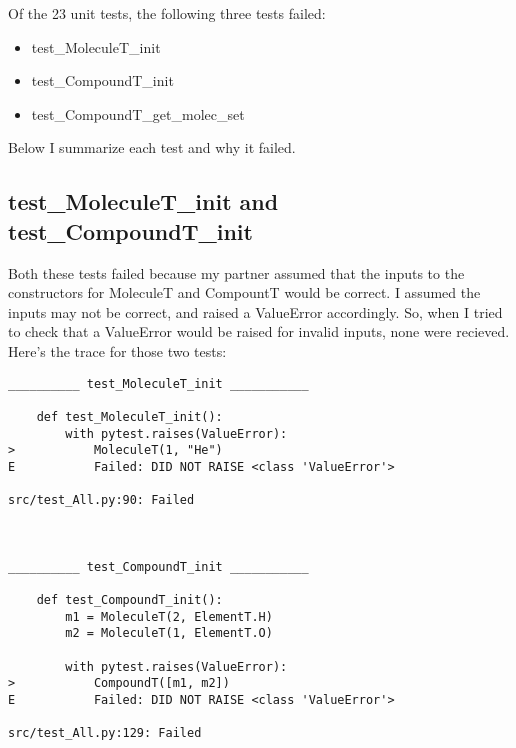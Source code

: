 \documentclass[12pt]{article}
\begin{document}
Of the 23 unit tests, the following three tests failed:
\begin{itemize}
    \item test\_MoleculeT\_init
    \item test\_CompoundT\_init
    \item test\_CompoundT\_get\_molec\_set
\end{itemize}
Below I summarize each test and why it failed.

\clearpage
\subsection{test\_MoleculeT\_init and test\_CompoundT\_init}
Both these tests failed because my partner assumed that the inputs to the constructors for MoleculeT and CompountT would be correct. I assumed the inputs may not be correct, and raised a ValueError accordingly. So, when I tried to check that a ValueError would be raised for invalid inputs, none were recieved. Here's the trace for those two tests:
\begin{lstlisting}
__________ test_MoleculeT_init ___________

    def test_MoleculeT_init():
        with pytest.raises(ValueError):
>           MoleculeT(1, "He")
E           Failed: DID NOT RAISE <class 'ValueError'>

src/test_All.py:90: Failed



__________ test_CompoundT_init ___________

    def test_CompoundT_init():
        m1 = MoleculeT(2, ElementT.H)
        m2 = MoleculeT(1, ElementT.O)

        with pytest.raises(ValueError):
>           CompoundT([m1, m2])
E           Failed: DID NOT RAISE <class 'ValueError'>

src/test_All.py:129: Failed
\end{lstlisting}

\clearpage
\end{document}
